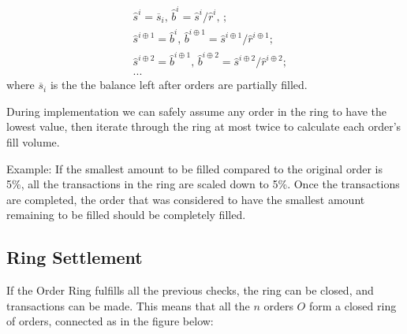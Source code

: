 \documentclass[UTF8,nofonts]{article}
\makeatletter
\newenvironment{figurehere}
 {\def\@captype{figure}}
 {}
\makeatother
\begin{document}
\begin{multicols}{2}
\[
\begin{split}
&\hat{s}^{i}=\overline{s}_i\text{, } \hat{b}^{i}=\hat{s}^{i}/ \hat{r}^i\text{, }\text{;}\\
&\hat{s}^{i\oplus 1}=\hat{b}^i\text{, } \hat{b}^{i\oplus 1}=\hat{s}^{i\oplus 1}/ \hat{r}^{i\oplus 1}\text{;}\\
&\hat{s}^{i\oplus 2}=\hat{b}^{i\oplus 1}\text{, } \hat{b}^{i\oplus 2}=\hat{s}^{i\oplus 2}/ \hat{r}^{i\oplus 2}\text{;}\\
& ...
\end{split}
\]
where $\overline{s}_i$ is the the balance left after orders are partially filled.

During implementation we can safely assume any order in the ring to have the lowest value, then iterate through the ring at most twice to calculate each order's fill volume. 

Example: If the smallest amount to be filled compared to the original order is 5\%, all the transactions in the ring are scaled down to 5\%. Once the transactions are completed, the order that was considered to have the smallest amount remaining to be filled should be completely filled.

\subsection{Ring Settlement\label{sec:settlement}}

If the Order Ring fulfills all the previous checks, the ring can be closed, and transactions can be made. This means that all the $n$ orders $O$ form a closed ring of orders, connected as in the figure below:

\begin{center}
\begin{figurehere}
\centering
{}
\end{figurehere}
\end{center}
\end{multicols}
\end{document}
